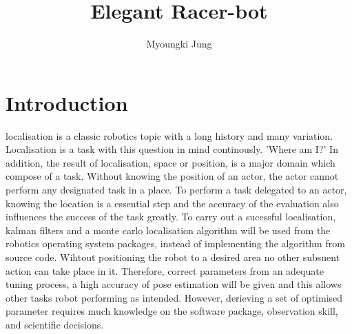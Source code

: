 \documentclass[10pt,journal,compsoc]{IEEEtran}
\begin{document}
\title{Elegant Racer-bot}

\author{Myoungki Jung}

%
{}


\maketitle
\IEEEdisplaynontitleabstractindextext
\IEEEpeerreviewmaketitle
\section{Introduction}
\label{sec:introduction}

 localisation is a classic robotics topic with a long history and many variation. Localisation is a task with this question in mind continously.
'Where am I?' In addition, the result of localisation, space or position, is a major domain which compose of a task.
Without knowing the position of an actor, the actor cannot perform any designated task in a place. To perform a task delegated to an actor, knowing the location is a essential step and the accuracy of the evaluation also influences the success of the task greatly.
To carry out a sucessful localisation, kalman filters and a monte carlo localisation algorithm will be used from the robotics operating system packages, instead of implementing the algorithm from source code.
Wihtout positioning the robot to a desired area no other subsuent action can take place in it. Therefore, correct parameters from an adequate tuning process, a high accuracy of pose estimation will be given and this allows other tasks robot performing as intended. However, derieving a set of optimised parameter requires much knowledge on the software package, observation skill, and scientific decisions.
\end{document}
